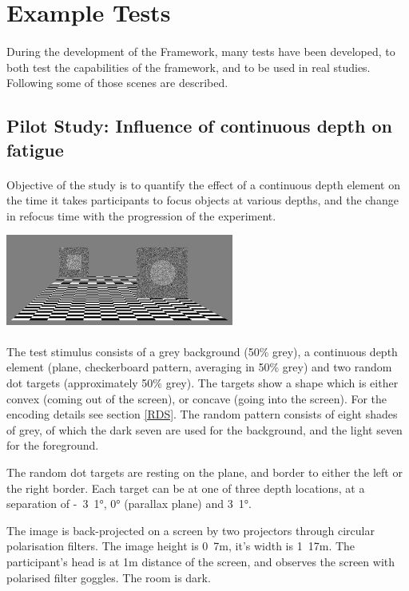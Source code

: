 \section{Example Tests}
\paragraph{}
During the development of the Framework, many tests have been developed, to both test the capabilities of the framework, and to be used in real studies. Following some of those scenes are described.


\subsection[Influence of continuous depth]{Pilot Study: Influence of continuous depth on fatigue}
\paragraph{}
Objective of the study is to quantify the effect of a continuous depth element on the time it takes participants to focus objects at various depths, and the change in refocus time with the progression of the experiment.

\begin{center}
\includegraphics[width=7.5cm]{media/pilotFatigue.png}
\end{center}

\paragraph{}
The test stimulus consists of a grey background (50\% grey), a continuous depth element (plane, checkerboard pattern, averaging in 50\% grey) and two random dot targets (approximately 50\% grey).
The targets show a shape which is either convex (coming out of the screen), or concave (going into the screen).
For the encoding details see section \ref{RDS}. The random pattern consists of eight shades of grey, of which the dark seven are used for the background, and the light seven for the foreground.

The random dot targets are resting on the plane, and border to either the left or the right border.
Each target can be at  one of three depth locations, at a separation of \unit{-3.1}{°}, \unit{0}{°} (parallax plane) and \unit{3.1}{°}.

The image is back-projected on a screen by two projectors through circular polarisation filters. The image height is \unit{0.7}{m}, it's width is \unit{1.17}{m}. The participant's head is at \unit{1}{m} distance of the screen, and observes the screen with polarised filter goggles. The room is dark.



